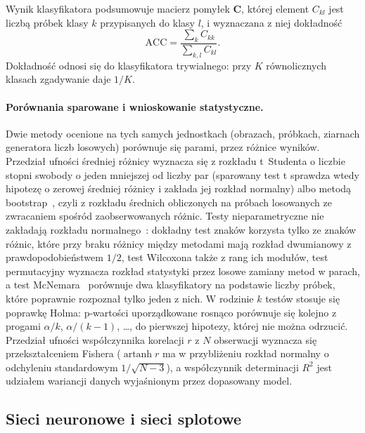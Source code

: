 Wynik klasyfikatora podsumowuje macierz pomyłek $\mathbf{C}$, której element $C_{kl}$ jest liczbą próbek klasy $k$ przypisanych do klasy $l$, i wyznaczana z niej dokładność
\begin{equation}\label{eq:tb:ml:metrics}
\mathrm{ACC}=\frac{\sum_{k}C_{kk}}{\sum_{k,l}C_{kl}}.
\end{equation}
Dokładność odnosi się do klasyfikatora trywialnego: przy $K$ równolicznych klasach zgadywanie daje $1/K$.

\paragraph{Porównania sparowane i wnioskowanie statystyczne.}\label{par:tb:ml:stats}
Dwie metody ocenione na tych samych jednostkach (obrazach, próbkach, ziarnach generatora liczb losowych) porównuje się parami, przez różnice wyników.
Przedział ufności średniej różnicy wyznacza się z rozkładu t~Studenta o liczbie stopni swobody o jeden mniejszej od liczby par (sparowany test t sprawdza wtedy hipotezę o zerowej średniej różnicy i zakłada jej rozkład normalny) albo metodą bootstrap~\cite{efron_bootstrap_1979}, czyli z rozkładu średnich obliczonych na próbach losowanych ze zwracaniem spośród zaobserwowanych różnic.
Testy nieparametryczne nie zakładają rozkładu normalnego~\cite{bib:statistics_wilc}: dokładny test znaków korzysta tylko ze znaków różnic, które przy braku różnicy między metodami mają rozkład dwumianowy z prawdopodobieństwem $1/2$, test Wilcoxona także z rang ich modułów, test permutacyjny wyznacza rozkład statystyki przez losowe zamiany metod w parach, a test McNemara~\cite{mcnemar_note_1947} porównuje dwa klasyfikatory na podstawie liczby próbek, które poprawnie rozpoznał tylko jeden z nich.
W rodzinie $k$ testów stosuje się poprawkę Holma: p-wartości uporządkowane rosnąco porównuje się kolejno z progami $\alpha/k$, $\alpha/(k-1)$, \dots, do pierwszej hipotezy, której nie można odrzucić.
Przedział ufności współczynnika korelacji $r$ z $N$ obserwacji wyznacza się przekształceniem Fishera ($\operatorname{artanh}r$ ma w przybliżeniu rozkład normalny o odchyleniu standardowym $1/\sqrt{N-3}$), a współczynnik determinacji $R^2$ jest udziałem wariancji danych wyjaśnionym przez dopasowany model.

\subsection{Sieci neuronowe i sieci splotowe}\label{subsec:tb:ml:cnn}

